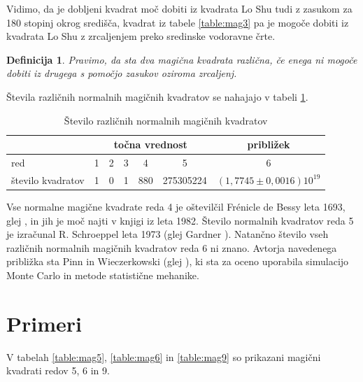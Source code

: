\documentclass[a4paper,12pt]{article}
\newcommand{\pojem}[1]{\emph{\color{purple}#1}}
\newtheorem{definicija}{Definicija}
\begin{document}
Vidimo, da je dobljeni kvadrat moč dobiti iz kvadrata Lo Shu tudi z zasukom za
180 stopinj okrog središča, kvadrat iz tabele \ref{table:mag3} pa je mogoče dobiti
iz kvadrata Lo Shu z zrcaljenjem preko sredinske vodoravne črte.


\begin{definicija}
      Pravimo, da sta dva magična kvadrata \pojem{različna}, če enega ni mogoče dobiti
      iz drugega s pomočjo zasukov oziroma zrcaljenj.
\end{definicija}


Števila različnih normalnih magičnih kvadratov se nahajajo v tabeli \ref{table:stevila}.

\begin{table}[!ht]
   \centering
   \caption{Število različnih normalnih magičnih kvadratov}
   
   \begin{tabular}{lcccccc}\toprule
	   & \multicolumn{5}{c}{točna vrednost} & približek \\ \midrule
      red & 1 & 2 & 3 & 4 & 5 & 6 \\
      število kvadratov & 1 & 0 & 1 & 880 & 275305224 & \((1,7745 \pm 0,0016)10^{19}\) \\ \bottomrule
   \end{tabular}
   \label{table:stevila}
\end{table} %

Vse normalne magične kvadrate reda 4 je oštevilčil Frénicle de Bessy
leta 1693, glej \cite{bessy}, in jih je moč najti v knjigi \cite{berlekamp}
iz leta 1982. Število normalnih kvadratov reda 5 je izračunal
R. Schroeppel leta 1973 (glej Gardner \cite{gardner}).
Natančno število vseh različnih normalnih magičnih kvadratov reda 6 ni znano.
Avtorja navedenega približka sta Pinn in Wieczerkowski (glej \cite{pinn}), ki
sta za oceno uporabila simulacijo Monte Carlo in metode statistične mehanike.


\section{Primeri}

V tabelah \ref{table:mag5}, \ref{table:mag6} in \ref{table:mag9} so prikazani
magični kvadrati redov 5, 6 in 9.
\end{document}
